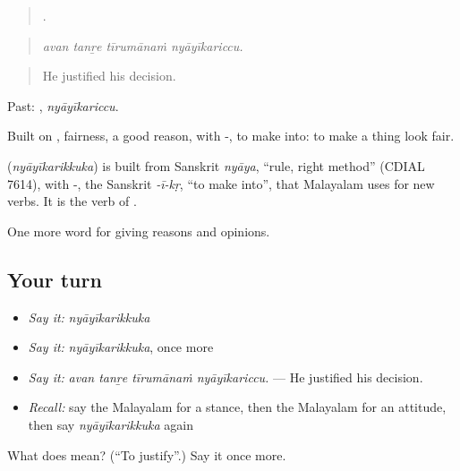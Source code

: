 \begin{quote}
   .
\end{quote}

\begin{quote}
\emph{avan tanṟe tīrumānaṁ nyāyīkariccu.}
\end{quote}

\begin{quote}
He justified his decision.
\end{quote}

Past: , \emph{nyāyīkariccu}.

Built on , fairness, a good reason, with -, to make into: to make a thing look fair.

\begin{cousinweb}
\textbf{} (\emph{nyāyīkarikkuka}) is built from Sanskrit \emph{nyāya}, \textquotedblleft{}rule, right method\textquotedblright{} (CDIAL 7614), with -, the Sanskrit \emph{-ī-kṛ}, \textquotedblleft{}to make into\textquotedblright{}, that Malayalam uses for new verbs. It is the verb of .
\end{cousinweb}

\begin{grammarlens}[title={What you've built}]
One more word for giving reasons and opinions.
\end{grammarlens}

\subsection*{Your turn}
\begin{itemize}
\raggedright
  \item \emph{Say it:} \emph{nyāyīkarikkuka}
  \item \emph{Say it:} \emph{nyāyīkarikkuka}, once more
  \item \emph{Say it:} \emph{avan tanṟe tīrumānaṁ nyāyīkariccu.} — He justified his decision.
  \item \emph{Recall:} say the Malayalam for a stance, then the Malayalam for an attitude, then say \emph{nyāyīkarikkuka} again
\end{itemize}

\begin{tcolorbox}[breakable,colback=teal!4,colframe=teal!35!black,title={Before you move on}]
What does  mean? (\textquotedblleft{}To justify\textquotedblright{}.) Say it once more.
\end{tcolorbox}
